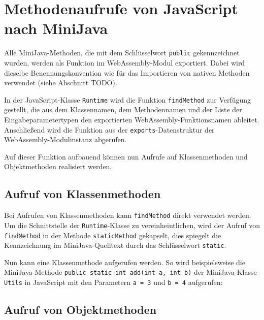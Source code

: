 \section{Methodenaufrufe von JavaScript nach MiniJava}

Alle MiniJava-Methoden, die mit dem Schlüsselwort \lstinline{public} gekennzeichnet wurden, werden als Funktion im WebAssembly-Modul exportiert. Dabei wird dieselbe Benennungskonvention wie für das Importieren von nativen Methoden verwendet (siehe Abschnitt TODO).

In der JavaScript-Klasse \lstinline{Runtime} wird die Funktion \lstinline{findMethod} zur Verfügung gestellt, die aus dem Klassennamen, dem Methodennamen und der Liste der Eingabeparametertypen den exportierten WebAssembly-Funktionsnamen ableitet. Anschließend wird die Funktion aus der \lstinline{exports}-Datenstruktur der WebAssembly-Modulinstanz abgerufen.



Auf dieser Funktion aufbauend können nun Aufrufe auf Klassenmethoden und Objektmethoden realisiert werden.

\subsection{Aufruf von Klassenmethoden}

Bei Aufrufen von Klassenmethoden kann \lstinline{findMethod} direkt verwendet werden. Um die Schnittstelle der \lstinline{Runtime}-Klasse zu vereinheintlichen, wird der Aufruf von \lstinline{findMethod} in der Methode \lstinline{staticMethod} gekapselt, dies spiegelt die Kennzeichnung im MiniJava-Quelltext durch das Schlüsselwort \lstinline{static}.



Nun kann eine Klassenmethode aufgerufen werden. So wird beispielsweise die Mini\-Java-Methode \lstinline{public static int add(int a, int b)} der MiniJava-Klasse \lstinline{Utils} in Java\-Script mit den Parametern \lstinline{a = 3} und \lstinline{b = 4} aufgerufen:



\subsection{Aufruf von Objektmethoden}


